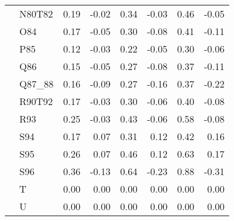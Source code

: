 \begin{tabular}{llrrrrrr}
 & N80T82 & 0.19 & -0.02 & 0.34 & -0.03 & 0.46 & -0.05 \\
 & O84 & 0.17 & -0.05 & 0.30 & -0.08 & 0.41 & -0.11 \\
 & P85 & 0.12 & -0.03 & 0.22 & -0.05 & 0.30 & -0.06 \\
 & Q86 & 0.15 & -0.05 & 0.27 & -0.08 & 0.37 & -0.11 \\
 & Q87_88 & 0.16 & -0.09 & 0.27 & -0.16 & 0.37 & -0.22 \\
 & R90T92 & 0.17 & -0.03 & 0.30 & -0.06 & 0.40 & -0.08 \\
 & R93 & 0.25 & -0.03 & 0.43 & -0.06 & 0.58 & -0.08 \\
 & S94 & 0.17 & 0.07 & 0.31 & 0.12 & 0.42 & 0.16 \\
 & S95 & 0.26 & 0.07 & 0.46 & 0.12 & 0.63 & 0.17 \\
 & S96 & 0.36 & -0.13 & 0.64 & -0.23 & 0.88 & -0.31 \\
 & T & 0.00 & 0.00 & 0.00 & 0.00 & 0.00 & 0.00 \\
 & U & 0.00 & 0.00 & 0.00 & 0.00 & 0.00 & 0.00 \\
\cline{1-8}
\bottomrule
\end{tabular}
